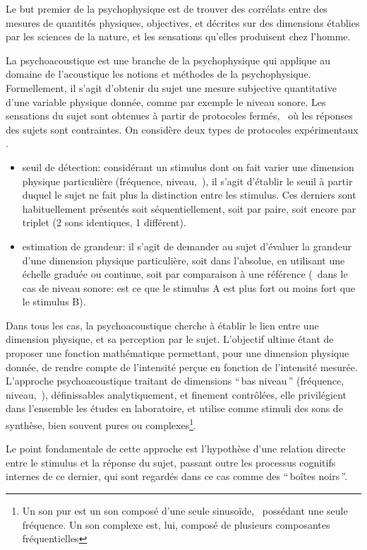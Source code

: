 Le but premier de la psychophysique est de trouver des corrélats entre des mesures de quantités physiques, objectives, et décrites sur des dimensions établies par les sciences de la nature, et les sensations qu'elles produisent chez l'homme.

La psychoacoustique est une branche de la psychophysique qui applique au domaine de l'acoustique les notions et méthodes de la psychophysique. Formellement, il s'agit d'obtenir du sujet une mesure subjective quantitative d'une variable physique donnée, comme par exemple le niveau sonore. Les sensations du sujet sont obtenues à partir de protocoles fermés, \ie~où les réponses des sujets sont contraintes. On considère deux types de protocoles expérimentaux \citep[p. 29-30]{guastavino_etude_2003}.

\begin{itemize}
\item seuil de détection: considérant un stimulus dont on fait varier une dimension physique particulière (fréquence, niveau,~\etc), il s'agit d'établir le seuil à partir duquel le sujet ne fait plus la distinction entre les stimulus. Ces derniers sont habituellement présentés soit séquentiellement, soit par paire, soit encore par triplet (2 sons identiques, 1 différent).
\item estimation de grandeur: il s'agit de demander au sujet d'évaluer la grandeur d'une dimension physique particulière, soit dans l'absolue, en utilisant une échelle graduée ou continue, soit par comparaison à une référence (\eg~dans le cas de niveau sonore: est ce que le stimulus A est plus fort ou moins fort que le stimulus B).
\end{itemize}

Dans tous les cas, la psychoacoustique cherche à établir le lien entre une dimension physique, et sa perception par le sujet. L'objectif ultime étant de proposer une fonction mathématique permettant, pour une dimension physique donnée, de rendre compte de l'intensité perçue en fonction de l'intensité mesurée. L'approche psychoacoustique traitant de dimensions ``\,bas niveau\,'' (fréquence, niveau,~\etc),  définissables analytiquement, et finement contrôlées, elle privilégient dans l'ensemble les études en laboratoire, et utilise comme stimuli des sons de synthèse, bien souvent pures ou complexes\footnote{Un son pur est un son composé d'une seule sinusoïde, \ie~possédant une seule fréquence. Un son complexe est, lui, composé de plusieurs composantes fréquentielles}.

Le point fondamentale de cette approche est l'hypothèse d'une relation directe entre le stimulus et la réponse du sujet, passant outre les processus cognitifs internes de ce dernier, qui sont regardés dans ce cas comme des ``\,boîtes noirs\,''.

